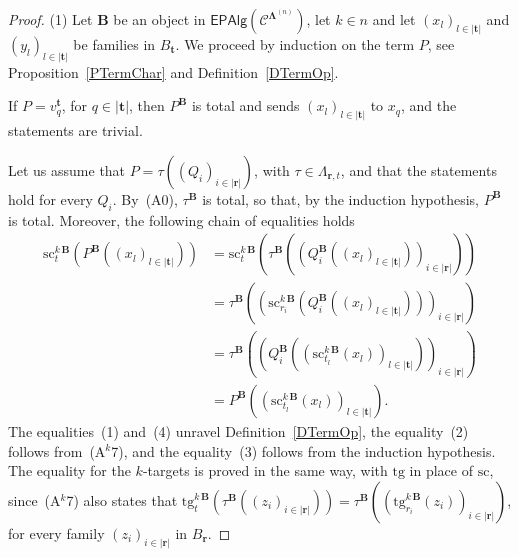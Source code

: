 \documentclass[a4paper, reqno]{amsbook}
\newcommand{\bb}[1]{\ensuremath{\lvert #1 \rvert}}
\newcommand{\sig}[1]{\mathbf{#1}}             %
\newcommand{\spec}[1]{\boldsymbol{\mathcal{#1}}} %
\newcommand{\src}{\mathrm{sc}}
\newcommand{\tgt}{\mathrm{tg}}
\theoremstyle{plain}
\theoremstyle{definition}
\begin{document}
\begin{proof}
(1) Let $\mathbf{B}$ be an object in $\mathsf{EPAlg}(\spec{C}^{\sig{\Lambda}^{(n)}})$, let $k\in n$ and let $(x_{l})_{l\in\bb{\mathbf{t}}}$ and $(y_{l})_{l\in\bb{\mathbf{t}}}$ be families in $B_{\mathbf{t}}$.
We proceed by induction on the term $P$, see Proposition~\ref{PTermChar} and Definition~\ref{DTermOp}.

If $P=v^{\mathbf{t}}_{q}$, for $q\in\bb{\mathbf{t}}$, then $P^{\mathbf{B}}$ is total and sends $(x_{l})_{l\in\bb{\mathbf{t}}}$ to $x_{q}$, and the statements are trivial.

Let us assume that $P=\tau((Q_{i})_{i\in\bb{\mathbf{r}}})$, with $\tau\in\Lambda_{\mathbf{r},t}$, and that the statements hold for every $Q_{i}$.
By~(A0), $\tau^{\mathbf{B}}$ is total, so that, by the induction hypothesis, $P^{\mathbf{B}}$ is total.
Moreover, the following chain of equalities holds
\begin{align*}
\src^{k\,\mathbf{B}}_{t}\left(P^{\mathbf{B}}\left((x_{l})_{l\in\bb{\mathbf{t}}}\right)\right)
&=
\src^{k\,\mathbf{B}}_{t}\left(\tau^{\mathbf{B}}\left(\left(Q_{i}^{\mathbf{B}}\left((x_{l})_{l\in\bb{\mathbf{t}}}\right)\right)_{i\in\bb{\mathbf{r}}}\right)\right)
\tag{1}
\\&=
\tau^{\mathbf{B}}\left(\left(\src^{k\,\mathbf{B}}_{r_{i}}\left(Q_{i}^{\mathbf{B}}\left((x_{l})_{l\in\bb{\mathbf{t}}}\right)\right)\right)_{i\in\bb{\mathbf{r}}}\right)
\tag{2}
\\&=
\tau^{\mathbf{B}}\left(\left(Q_{i}^{\mathbf{B}}\left(\left(\src^{k\,\mathbf{B}}_{t_{l}}(x_{l})\right)_{l\in\bb{\mathbf{t}}}\right)\right)_{i\in\bb{\mathbf{r}}}\right)
\tag{3}
\\&=
P^{\mathbf{B}}\left(\left(\src^{k\,\mathbf{B}}_{t_{l}}(x_{l})\right)_{l\in\bb{\mathbf{t}}}\right).
\tag{4}
\end{align*}
The equalities~(1) and~(4) unravel Definition~\ref{DTermOp}, the equality~(2) follows from~(A$^{k}$7), and the equality~(3) follows from the induction hypothesis.
The equality for the $k$-targets is proved in the same way, with $\tgt$ in place of $\src$, since~(A$^{k}$7) also states that $\tgt^{k\,\mathbf{B}}_{t}(\tau^{\mathbf{B}}((z_{i})_{i\in\bb{\mathbf{r}}}))=\tau^{\mathbf{B}}((\tgt^{k\,\mathbf{B}}_{r_{i}}(z_{i}))_{i\in\bb{\mathbf{r}}})$, for every family $(z_{i})_{i\in\bb{\mathbf{r}}}$ in $B_{\mathbf{r}}$.


\end{proof}
\end{document}

